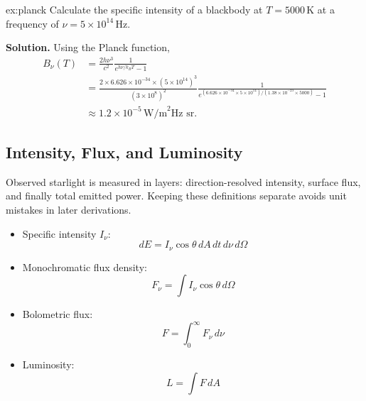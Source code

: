 \begin{example}{}{ex:planck}
    Calculate the specific intensity of a blackbody at $T=5000\,\text{K}$ at a frequency of $\nu = 5 \times 10^{14}\,\text{Hz}$.

    \smallskip\textbf{Solution.}
    Using the Planck function,
    \begin{align*}
    B_\nu(T) &= \frac{2h\nu^3}{c^2}\frac{1}{e^{h\nu/k_B T}-1} \\
    &= \frac{2 \times 6.626 \times 10^{-34} \times (5 \times 10^{14})^3}{(3 \times 10^8)^2} \frac{1}{e^{(6.626 \times 10^{-34} \times 5 \times 10^{14})/(1.38 \times 10^{-23} \times 5000)} - 1} \\
    &\approx 1.2 \times 10^{-5}\,\text{W/m}^2\text{Hz sr}.
    \end{align*}    
\end{example}

\bigskip\noindent \bigskip\noindent \bigskip\noindent
\subsection{Intensity, Flux, and Luminosity}
\begin{intuition}
Observed starlight is measured in layers: direction-resolved intensity, surface flux, and finally total emitted power.
Keeping these definitions separate avoids unit mistakes in later derivations.
\end{intuition}

\begin{theory}
\begin{itemize}
    \item Specific intensity $I_\nu$:
    \begin{equation}
        dE = I_\nu \cos\theta \, dA \, dt \, d\nu \, d\Omega
    \end{equation}
    \item Monochromatic flux density:
    \begin{equation}
        F_\nu = \int I_\nu \cos\theta \, d\Omega
    \end{equation}
    \item Bolometric flux:
    \begin{equation}
        F = \int_0^\infty F_\nu \, d\nu
    \end{equation}
    \item Luminosity:
    \begin{equation}
        L = \int F \, dA
    \end{equation}
\end{itemize}
\end{theory}

